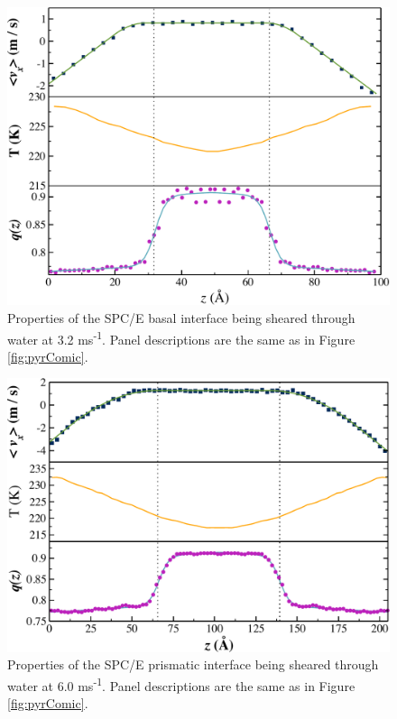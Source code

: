 \begin{figure}
\includegraphics[width=\linewidth]{Figures/Bas_comic_strip}
\caption{\label{fig:bComic} Properties of the SPC/E basal interface being
  sheared through water at 3.2 ms\textsuperscript{-1}.  Panel
  descriptions are the same as in Figure \ref{fig:pyrComic}.}
\end{figure}

\begin{figure}
\includegraphics[width=\linewidth]{Figures/Pri_comic_strip}
\caption{\label{fig:pComic} Properties of the SPC/E prismatic interface
  being sheared through water at 6.0 ms\textsuperscript{-1}.  Panel
  descriptions are the same as in Figure \ref{fig:pyrComic}.}
\end{figure}

